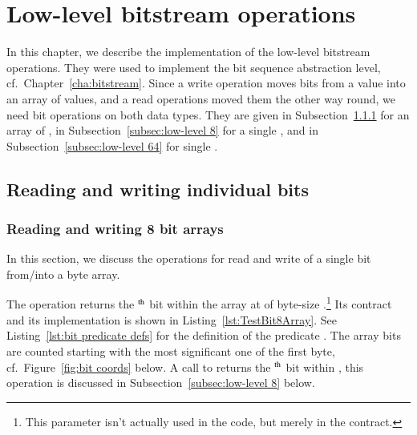 
\FloatBarrier

\chapter{Low-level bitstream operations}
\label{cha:low-level bitstream}

In this chapter, we describe the implementation of the
low-level bitstream operations.
%
They were used to implement the bit sequence abstraction level, cf.\
Chapter~\ref{cha:bitstream}.
%
Since a write operation moves bits from a  value
into an array of  values, and a read operations
moved them the other way round,
we need bit operations on both data types.
%
They are given in
Subsection~\ref{subsec:low-level 8 array} 
for an array of , 
in Subsection~\ref{subsec:low-level 8} for a single ,
and
in Subsection~\ref{subsec:low-level 64} for single .













\FloatBarrier

\section{Reading and writing individual bits}


\subsection{Reading and writing 8 bit arrays}
\label{subsec:low-level 8 array}


In this section, we discuss the operations for read and write of a
single bit from/into a byte array.

The operation  returns the
$^{\mbox{\scriptsize th}}$ bit
within the array at 
of byte-size .\footnote{
	This parameter isn't actually used in the code, but merely
	in the contract.
}
Its contract and its implementation is shown in
Listing~\ref{lst:TestBit8Array}.
%
See Listing~\ref{lst:bit predicate defs} for the definition of the predicate
\inl{Bit8Array}.
%
The array bits are counted starting with the most significant one of
the first byte,
cf.\ Figure~\ref{fig:bit coords} below.
%
A call to  returns the 
$^{\mbox{\scriptsize th}}$ bit
within , this operation is discussed in
Subsection~\ref{subsec:low-level 8} below.








